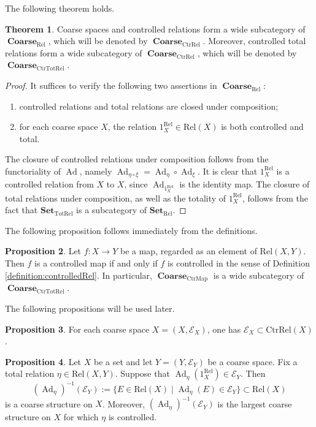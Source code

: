 \documentclass[12pt, a4paper]{amsart}
\theoremstyle{definition}
\newtheorem{theorem}{Theorem}[section]
\newtheorem{proposition}[theorem]{Proposition}
\newcommand{\Ad}{\mathop{\mathrm{Ad}}\nolimits}
\newcommand{\Coarse}{\mathop{\mathbf{Coarse}}\nolimits}
\newcommand{\Rel}{\mathrm{Rel}}
\newcommand{\TotRel}{\mathrm{TotRel}}
\newcommand{\CtrMap}{\mathrm{CtrMap}}
\newcommand{\CtrTotRel}{\mathrm{CtrTotRel}}
\newcommand{\CtrRel}{\mathrm{CtrRel}}
\newcommand{\Set}{{\mathbf{Set}}}
\begin{document}
The following theorem holds.

\begin{theorem}
Coarse spaces and controlled relations form a wide subcategory of
$\Coarse_{\Rel}$, which will be denoted by $\Coarse_{\CtrRel}$.
Moreover, controlled total relations form a wide subcategory of
$\Coarse_{\CtrRel}$, which will be denoted by $\Coarse_{\CtrTotRel}$.
\end{theorem}

\begin{proof}
It suffices to verify the following two assertions in $\Coarse_{\Rel}$:
\begin{enumerate}
\item
controlled relations and total relations are closed under composition;

\item
for each coarse space $X$, the relation $1_X^{\Rel}\in\Rel(X)$ is both
controlled and total.
\end{enumerate}
The closure of controlled relations under composition follows from the
functoriality of $\Ad$, namely
$\Ad_{\eta\circ\xi}=\Ad_\eta\circ\Ad_\xi$.
It is clear that $1_X^{\Rel}$ is a controlled relation from $X$ to $X$,
since $\Ad_{1_X^{\Rel}}$ is the identity map.
The closure of total relations under composition, as well as the totality of
$1_X^{\Rel}$, follows from the fact that $\Set_{\TotRel}$ is a subcategory
of $\Set_{\Rel}$.
\end{proof}

The following proposition follows immediately from the definitions.

\begin{proposition}\label{proposition:controlled_rel_map}
Let $f:X\to Y$ be a map, regarded as an element of $\Rel(X,Y)$.
Then $f$ is a controlled map if and only if $f$ is controlled in the sense of
Definition \ref{definition:controlledRel}.
In particular, $\Coarse_{\CtrMap}$ is a wide subcategory of
$\Coarse_{\CtrTotRel}$.
\end{proposition}

The following propositions will be used later.

\begin{proposition}\label{proposition:ent_cont}
For each coarse space $X=(X,\mathcal{E}_X)$, one has 
$\mathcal{E}_X
\subset
\CtrRel(X)$.
\end{proposition}

\begin{proposition}\label{proposition:invCstr}
Let $X$ be a set and let $Y=(Y,\mathcal{E}_Y)$ be a coarse space.
Fix a total relation $\eta\in\Rel(X,Y)$.
Suppose that
$\Ad_\eta(1_X^\Rel)
\in
\mathcal{E}_Y$.
Then
\[
(\Ad_\eta)^{-1}(\mathcal{E}_Y) := \{ E \in \Rel(X) \mid \Ad_{\eta}(E) \in \mathcal{E}_Y \} 
\subset
\Rel(X)
\]
is a coarse structure on $X$.
Moreover, $(\Ad_\eta)^{-1}(\mathcal{E}_Y)$ is the largest coarse structure
on $X$ for which $\eta$ is controlled.
\end{proposition}
\end{document}
